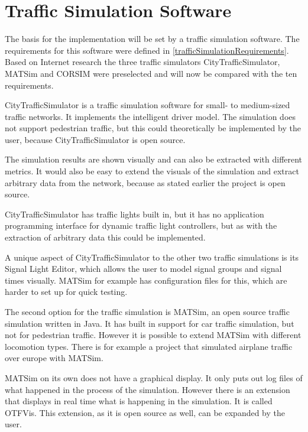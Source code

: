 \section{Traffic Simulation Software}

The basis for the implementation will be set by a traffic simulation software. The requirements for this software were defined in \ref{trafficSimulationRequirements}. Based on Internet research the three traffic simulators CityTrafficSimulator, MATSim and CORSIM were preselected and will now be compared with the ten requirements.

CityTrafficSimulator is a traffic simulation software for small- to medium-sized traffic networks.\cite{cityTrafficSimulator} It implements the intelligent driver model.\cite{trafficSimulationDe} The simulation does not support pedestrian traffic, but this could theoretically be implemented by the user, because CityTrafficSimulator is open source.

The simulation results are shown visually and can also be extracted with different metrics. It would also be easy to extend the visuals of the simulation and extract arbitrary data from the network, because as stated earlier the project is open source.

CityTrafficSimulator has traffic lights built in, but it has no application programming interface for dynamic traffic light controllers, but as with the extraction of arbitrary data this could be implemented.

A unique aspect of CityTrafficSimulator to the other two traffic simulations is its Signal Light Editor, which allows the user to model signal groups and signal times visually. MATSim for example has configuration files for this, which are harder to set up for quick testing.

The second option for the traffic simulation is MATSim, an open source traffic simulation written in Java.\cite{matsim} It has built in support for car traffic simulation, but not for pedestrian traffic. However it is possible to extend MATSim with different locomotion types. There is for example a project that simulated airplane traffic over europe with MATSim.

MATSim on its own does not have a graphical display. It only puts out log files of what happened in the process of the simulation. However there is an extension that displays in real time what is happening in the simulation. It is called OTFVis. This extension, as it is open source as well, can be expanded by the user.

